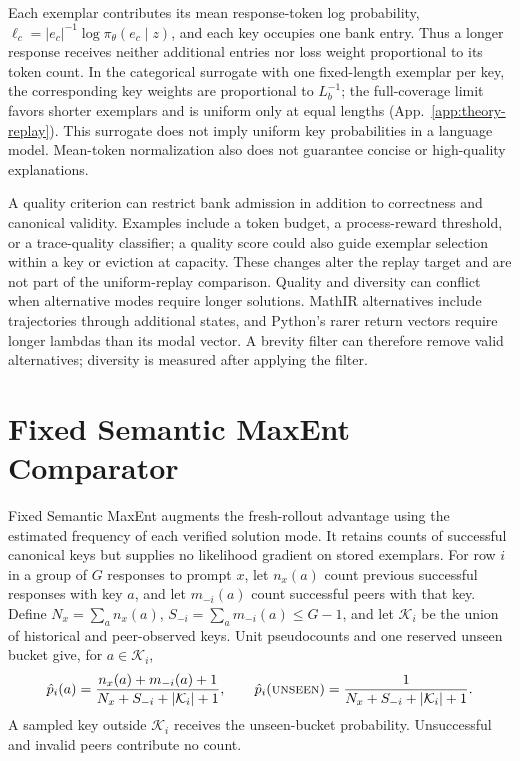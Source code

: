 \documentclass{article}
\newcommand{\1}{\mathbf 1}
\theoremstyle{remark}
\theoremstyle{definition}
\theoremstyle{plain}
\begin{document}
Each exemplar contributes its mean response-token log probability,
$\ell_c=|e_c|^{-1}\log\pi_\theta(e_c\mid z)$, and each key occupies one bank
entry. Thus a longer response receives neither additional entries nor loss
weight proportional to its token count. In the categorical surrogate with
one fixed-length exemplar per key, the corresponding key weights are
proportional to $L_b^{-1}$; the full-coverage limit favors shorter exemplars
and is uniform only at equal lengths (App.~\ref{app:theory-replay}). This
surrogate does not imply uniform key probabilities in a language model.
Mean-token normalization also does not guarantee concise or high-quality
explanations.

A quality criterion can restrict bank admission in addition to correctness
and canonical validity. Examples include a token budget, a process-reward
threshold, or a trace-quality classifier; a quality score could also guide
exemplar selection within a key or eviction at capacity. These changes
alter the replay target and are not part of the uniform-replay comparison.
Quality and diversity can conflict when alternative modes require longer
solutions. MathIR alternatives include trajectories through additional
states, and Python's rarer return vectors require longer lambdas than its
modal vector. A brevity filter can therefore remove valid alternatives;
diversity is measured after applying the filter.

\section{Fixed Semantic MaxEnt Comparator}
\label{app:semantic-maxent}

Fixed Semantic MaxEnt augments the fresh-rollout advantage using the
estimated frequency of each verified solution mode. It retains counts of
successful canonical keys but supplies no likelihood gradient on stored
exemplars. For row $i$ in a group of $G$ responses to prompt $x$, let
$n_x(a)$ count previous successful responses with key $a$, and let
$m_{-i}(a)$ count successful peers with that key. Define
$N_x=\sum_a n_x(a)$, $S_{-i}=\sum_a m_{-i}(a)\le G-1$, and let
$\mathcal K_i$ be the union of historical and peer-observed keys. Unit
pseudocounts and one reserved unseen bucket give, for $a\in\mathcal K_i$,
\begin{equation}
  \hat p_i(a)=\frac{n_x(a)+m_{-i}(a)+1}{N_x+S_{-i}+|\mathcal K_i|+1},\qquad
  \hat p_i(\textsc{unseen})=\frac{1}{N_x+S_{-i}+|\mathcal K_i|+1}.
  \label{eq:open-set-predictor}
\end{equation}
A sampled key outside $\mathcal K_i$ receives the unseen-bucket probability.
Unsuccessful and invalid peers contribute no count.
\end{document}
